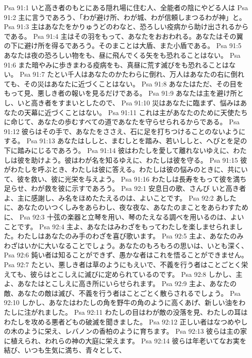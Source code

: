Psa 91:1  いと高き者のもとにある隠れ場に住む人、全能者の陰にやどる人は
Psa 91:2  主に言うであろう、「わが避け所、わが城、わが信頼しまつるわが神」と。
Psa 91:3  主はあなたをかりゅうどのわなと、恐ろしい疫病から助け出されるからである。
Psa 91:4  主はその羽をもって、あなたをおおわれる。あなたはその翼の下に避け所を得るであろう。そのまことは大盾、また小盾である。
Psa 91:5  あなたは夜の恐ろしい物をも、昼に飛んでくる矢をも恐れることはない。
Psa 91:6  また暗やみに歩きまわる疫病をも、真昼に荒す滅びをも恐れることはない。
Psa 91:7  たとい千人はあなたのかたわらに倒れ、万人はあなたの右に倒れても、その災はあなたに近づくことはない。
Psa 91:8  あなたはただ、その目をもって見、悪しき者の報いを見るだけである。
Psa 91:9  あなたは主を避け所とし、いと高き者をすまいとしたので、
Psa 91:10  災はあなたに臨まず、悩みはあなたの天幕に近づくことはない。
Psa 91:11  これは主があなたのために天使たちに命じて、あなたの歩むすべての道であなたを守らせられるからである。
Psa 91:12  彼らはその手で、あなたをささえ、石に足を打ちつけることのないようにする。
Psa 91:13  あなたはししと、まむしとを踏み、若いししと、へびとを足の下に踏みにじるであろう。
Psa 91:14  彼はわたしを愛して離れないゆえに、わたしは彼を助けよう。彼はわが名を知るゆえに、わたしは彼を守る。
Psa 91:15  彼がわたしを呼ぶとき、わたしは彼に答える。わたしは彼の悩みのときに、共にいて、彼を救い、彼に光栄を与えよう。
Psa 91:16  わたしは長寿をもって彼を満ち足らせ、わが救を彼に示すであろう。
Psa 92:1  安息日の歌、さんび いと高き者よ、主に感謝し、み名をほめたたえるのは、よいことです。
Psa 92:2  あしたに、あなたのいつくしみをあらわし、夜な夜な、あなたのまことをあらわすために、
Psa 92:3  十弦の楽器と立琴を用い、琴のたえなる調べを用いるのは、よいことです。
Psa 92:4  主よ、あなたはみわざをもってわたしを楽しませられました。わたしはあなたのみ手のわざを喜び歌います。
Psa 92:5  主よ、あなたのみわざはいかに大いなることでしょう。あなたのもろもろの思いは、いとも深く、
Psa 92:6  鈍い者は知ることができず、愚かな者はこれを悟ることができません。
Psa 92:7  たとい、悪しき者は草のようにもえいで、不義を行う者はことごとく栄えても、彼らはとこしえに滅びに定められているのです。
Psa 92:8  しかし、主よ、あなたはとこしえに高き所にいらせられます。
Psa 92:9  主よ、あなたの敵、あなたの敵は滅び、不義を行う者はことごとく散らされるでしょう。
Psa 92:10  しかし、あなたはわたしの角を野牛の角のように高くあげ、新しい油をわたしに注がれました。
Psa 92:11  わたしの目はわが敵の没落を見、わたしの耳はわたしを攻める悪者どもの破滅を聞きました。
Psa 92:12  正しい者はなつめやしの木のように栄え、レバノンの香柏のように育ちます。
Psa 92:13  彼らは主の家に植えられ、われらの神の大庭に栄えます。
Psa 92:14  彼らは年老いてなお実を結び、いつも生気に満ち、青々として、
